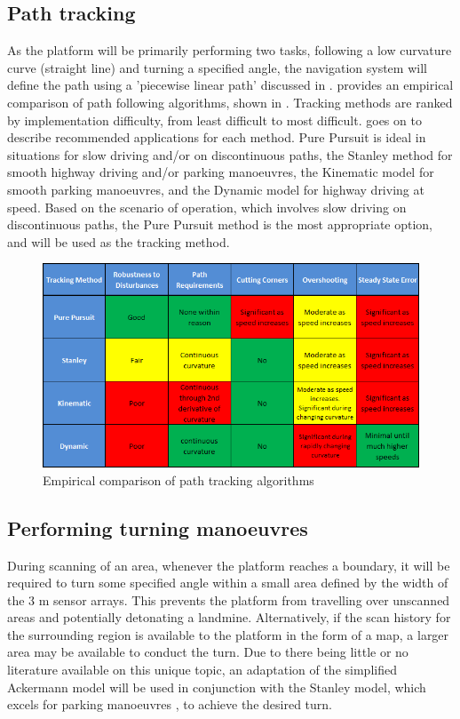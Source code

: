 \documentclass[main.tex]{subfiles}
\begin{document}
\subsection{Path tracking}
As the platform will be primarily performing two tasks, following a low curvature curve (straight line) and turning a specified angle, the navigation system will define the path using a 'piecewise linear path' discussed in . \Textcite{snider2009} provides an empirical comparison of path following algorithms, shown in . Tracking methods are ranked by implementation difficulty, from least difficult to most difficult. \Textcite{snider2009} goes on to describe recommended applications for each method. Pure Pursuit is ideal in situations for slow driving and/or on discontinuous paths, the Stanley method for smooth highway driving and/or parking manoeuvres, the Kinematic model for smooth parking manoeuvres, and the Dynamic model for highway driving at speed. Based on the scenario of operation, which involves slow driving on discontinuous paths, the Pure Pursuit method is the most appropriate option, and will be used as the tracking method.
\begin{figure}[ht]
\includegraphics[width = \textwidth]{3-ConceptDesign/pathTrackingSummary2.png}
\centering
\caption[Empirical comparison of path tracking algorithms]{Empirical comparison of path tracking algorithms \parencite{snider2009}} 
\end{figure}

\subsection{Performing turning manoeuvres}
During scanning of an area, whenever the platform reaches a boundary, it will be required to turn some specified angle within a small area defined by the width of the 3 m sensor arrays. This prevents the platform from travelling over unscanned areas and potentially detonating a landmine. Alternatively, if the scan history for the surrounding region is available to the platform in the form of a map, a larger area may be available to conduct the turn. Due to there being little or no literature available on this unique topic, an adaptation of the simplified Ackermann model will be used in conjunction with the Stanley model, which excels for parking manoeuvres \parencite{snider2009}, to achieve the desired turn.
\end{document}
